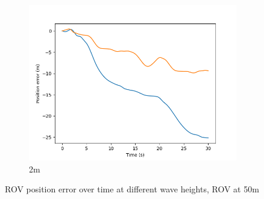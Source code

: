 \documentclass[class=article, crop=false]{standalone}
\begin{document}
\begin{figure}
\begin{subfigure}[b]{0.48\textwidth}
        \includegraphics{scenario1/rov-50m/2.0m/rov_position_error_uncontrolled}
        \caption{2m}
        \label{}
    \end{subfigure}

    \caption{ROV position error over time at different wave heights, ROV at 50m}
\end{figure}
\end{document}
